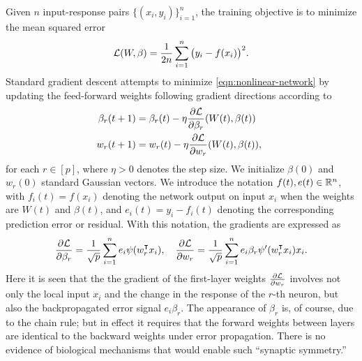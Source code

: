Given $n$ input-response pairs $\{(x_i,y_i)\}_{i=1}^n$, the training objective is to minimize the mean squared error
\begin{equation}\label{eqn:squared-loss}
    \mathcal{L}(W,\beta) = \frac{1}{2n}\sum_{i=1}^n \big(y_i - f(x_i)\big)^2.
\end{equation}
Standard gradient descent attempts to minimize \eqref{eqn:nonlinear-network} by updating the feed-forward weights following gradient directions according to
\begin{align*}
    \beta_r(t+1) &= \beta_r(t)-\eta\frac{\partial\mathcal{L}}{\partial \beta_r}(W(t),\beta(t)) \quad\\ w_r(t+1) &= w_r(t)-\eta\frac{\partial\mathcal{L}}{\partial w_r}(W(t),\beta(t)),
\end{align*}
for each $r\in[p]$, where $\eta>0$ denotes the step size. We initialize $\beta(0)$ and $w_r(0)$  standard Gaussian vectors. We introduce the notation $f(t), e(t)\in \mathbb{R}^n$, with $f_i(t) = f(x_i)$ denoting the network output on input $x_i$ when the weights are $W(t)$ and $\beta(t)$, and $e_i(t) = y_i-f_i(t)$ denoting the corresponding prediction error or residual. With this notation,
the gradients are expressed as
\begin{equation*}
    \frac{\partial\Loss}{\partial \beta_r} = \frac{1}{\sqrt p}\sum_{i=1}^n e_i\psi(w_r\transpose x_i), \quad
    \frac{\partial\Loss}{\partial w_r} = \frac{1}{\sqrt p} \sum_{i=1}^n e_i \beta_r\psi'(w_r\transpose x_i)x_i.
\end{equation*}
Here it is seen that the the gradient of the first-layer weights $\frac{\partial \mathcal{L}}{\partial w_r}$ involves not only the local input $x_i$ and the change in
the response of the $r$-th neuron, but also the backpropagated error signal $e_i\beta_r$.
The appearance of $\beta_r$ is, of course, due to the chain rule; but in effect it requires that the forward weights between layers are identical to the backward weights under error propagation. There is no evidence of biological mechanisms that would enable such ``synaptic symmetry.''

